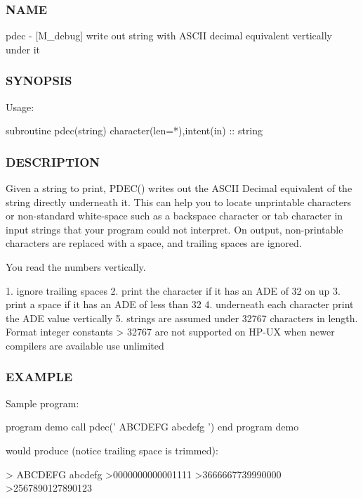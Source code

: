 \subsubsection*{N\+A\+ME}

pdec -\/ \mbox{[}M\+\_\+debug\mbox{]} write out string with A\+S\+C\+II decimal equivalent vertically under it 

\subsubsection*{S\+Y\+N\+O\+P\+S\+IS}

\begin{DoxyVerb}Usage:

 subroutine pdec(string)
 character(len=*),intent(in) :: string
\end{DoxyVerb}


\subsubsection*{D\+E\+S\+C\+R\+I\+P\+T\+I\+ON}

\begin{DoxyVerb}  Given a string to print, PDEC() writes out the ASCII Decimal equivalent of
  the string directly underneath it. This can help you to locate
  unprintable characters or non-standard white-space such as a
  backspace character or tab character in input strings that your
  program could not interpret. On output, non-printable characters
  are replaced with a space, and trailing spaces are ignored.

  You read the numbers vertically.

  1. ignore trailing spaces
  2. print the character if it has an ADE of 32 on up
  3. print a space if it has an ADE of less than 32
  4. underneath each character print the ADE value vertically
  5. strings are assumed under 32767 characters in length.
     Format integer constants > 32767 are not supported on HP-UX
     when newer compilers are available use unlimited
\end{DoxyVerb}


\subsubsection*{E\+X\+A\+M\+P\+LE}

\begin{DoxyVerb}Sample program:

   program demo
   call pdec(' ABCDEFG abcdefg ')
   end program demo

would produce (notice trailing space is trimmed):

  > ABCDEFG abcdefg
  >0000000000001111
  >3666667739990000
  >2567890127890123
\end{DoxyVerb}


